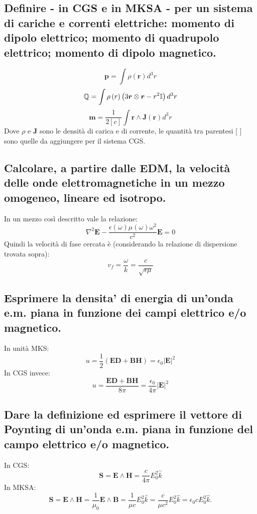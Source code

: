 \subsection[$\ $ Momento di dipolo elettrico e magnetico, quadrupolo elettrico]{Definire - in CGS e in MKSA - per un sistema di cariche e correnti elettriche: momento di dipolo elettrico; momento di quadrupolo elettrico;  momento di dipolo magnetico.}
\[
	\boldsymbol{p} = \int \rho \left( \boldsymbol{r} \right) d^{3}r     
\] 
\[
	\mathbb{Q} = \int \rho \left( r \right) \left( 3 \boldsymbol{r} \otimes \boldsymbol{r} -  r^2 \mathbb{I}  \right) d^3 r 
\] 
\[
	\boldsymbol{m} = \frac{1}{2[c]}\int \boldsymbol{r} \wedge \boldsymbol{J}\left(\boldsymbol{r}\right) d^3r
\] 
Dove $\rho$ e  $\boldsymbol{J}$ sono le densità di carica e di corrente, le quantità tra parentesi [ ] sono quelle da aggiungere per il sistema CGS.

\subsection[$\ $ Velocità delle onde elettromagnetiche in un mezzo lineare e isotropo]{Calcolare, a partire dalle EDM, la velocità delle onde elettromagnetiche in un mezzo omogeneo, lineare ed isotropo.}
In un mezzo così descritto vale la relazione:
\[
	\nabla^{2}\boldsymbol{E} - \frac{\epsilon\left( \omega \right) \mu \left( \omega \right) \omega^{2}}{c^{2}}\boldsymbol{E} = 0 
\] 
Quindi la velocità di fase cercata è (considerando la relazione di dispersione trovata sopra):
\[
v_{f} = \frac{\omega}{k} =  \frac{c}{\sqrt{\epsilon \mu} }
\] 
\subsection[$\ $ Densità di energia dell'onda elettromagnetica]{Esprimere la densita’ di energia di un’onda e.m. piana in funzione dei campi elettrico e/o magnetico.}
In unità MKS:
\[
	u = \frac{1}{2} \left( \boldsymbol{E}\boldsymbol{D} + \boldsymbol{B}\boldsymbol{H} \right) = \epsilon_0 |\boldsymbol{E}|^2    
\] 
In CGS invece:
\[
	u = \frac{\boldsymbol{E}\boldsymbol{D} + \boldsymbol{B}\boldsymbol{H}}{8\pi} = \frac{\epsilon_0}{4\pi} |\boldsymbol{E}|^2 
\]
\subsection[$\ $ Vettore di Poynting]{Dare la definizione ed esprimere il vettore di Poynting di un’onda e.m. piana in funzione del campo elettrico e/o magnetico.}
In CGS:
\[
	\boldsymbol{S} = \boldsymbol{E} \wedge \boldsymbol{H} = \frac{c}{4\pi} E_0^2 \hat{k}     
\] 
In MKSA:
\[
	\boldsymbol{S} = \boldsymbol{E} \wedge \boldsymbol{H} = \frac{1}{\mu_0} \boldsymbol{E} \wedge \boldsymbol{B} =\frac{1}{\mu c} E_0^2 \hat{k}=
	\frac{c}{\mu c^2} E_0^2 \hat{k} = \epsilon_0 c E_0^2 \hat{k}   
.\] 

